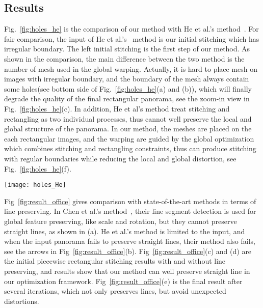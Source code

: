 \documentclass[10pt,journal,compsoc]{IEEEtran}
\begin{document}
 \subsection{Results}
Fig.~\ref{fig:holes_he} is the comparison of our method with He et al.'s method~\cite{journals/tog/HeC013}.
For fair comparison, the input of He et al.'s~\cite{journals/tog/HeC013} method is our initial stitching which has irregular boundary.
 The left initial stitching is the first step of our method. 
As shown in the comparison, the main difference between the two method is the number of mesh used in the global warping.
Actually, it is hard to place mesh on images with irregular boundary, and the boundary of the mesh always contain some holes(see bottom side of Fig.~\ref{fig:holes_he}(a) and (b)), 
which will finally degrade the quality of the final rectangular panorama, see the zoom-in view in Fig.~\ref{fig:holes_he}(c). 
In addition, He et al's method treat stitching and rectangling as two individual processes, thus cannot well preserve the local and global structure of the panorama. 
In our method, the meshes are placed on the each rectangular images, and the warping are guided by the global optimization which combines stitching and rectangling constraints, 
thus can produce stitching with regular boundaries while reducing the local and global distortion, see Fig.~\ref{fig:holes_he}(f).

 \begin{figure*} %
  \centering
  \texttt{[image: holes\_He]}
  \caption{Comparison with He et al.'s method~\cite{journals/tog/HeC013}. The initial stitching is the first step of our method, which is also the input of He et al.'s method~\cite{journals/tog/HeC013}. For He et al.'s method: (a) mesh of on the input image; (b) mesh after global warping; (c) final rectangular panorama.
  For our method: (d) meshes of our initial stitching; (e) meshes after the global warping; (f) our rectangular panorama.} \label{fig:holes_he}
\end{figure*}

Fig~\ref{fig:result_office} gives comparison with state-of-the-art methods in terms of line preserving. 
In Chen et al.'s method~\cite{conf/eccv/ChenC16}, their line segment detection is used for global feature preserving, like scale and rotation, but they cannot preserve straight lines, as shown in (a). 
He et al.'s method is limited to the input, and when the input panorama fails to preserve straight lines, their method also fails, see the arrows in Fig~\ref{fig:result_office}(b). 
Fig~\ref{fig:result_office}(c) and (d) are the initial piecewise rectangular stitching results with and without line preserving, 
and results show that our method can well preserve straight line in our optimization framework. 
Fig~\ref{fig:result_office}(e) is the final result after several iterations, which not only preserves lines, but avoid unexpected distortions.
\end{document}
